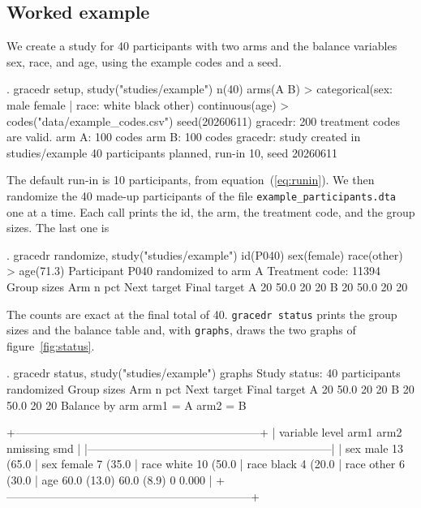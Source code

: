 \documentclass[bib]{statapress}
\begin{document}
\subsection{Worked example}

We create a study for 40 participants with two arms and the balance variables
sex, race, and age, using the example codes and a seed.

\begin{stlog}
. gracedr setup, study("studies/example") n(40) arms(A B)
>     categorical(sex: male female | race: white black other) continuous(age)
>     codes("data/example_codes.csv") seed(20260611)
gracedr: 200 treatment codes are valid.
  arm A: 100 codes
  arm B: 100 codes
gracedr: study created in studies/example
  40 participants planned, run-in 10, seed 20260611
\end{stlog}

\noindent The default run-in is 10 participants, from equation~(\ref{eq:runin}).
We then randomize the 40 made-up participants of the file
\texttt{example\_participants.dta} one at a time. Each call prints the id, the
arm, the treatment code, and the group sizes. The last one is

\begin{stlog}
. gracedr randomize, study("studies/example") id(P040) sex(female) race(other)
>     age(71.3)
Participant P040 randomized to arm A
Treatment code: 11394
Group sizes
Arm                        n     pct   Next target  Final target
A                         20    50.0            20            20
B                         20    50.0            20            20
\end{stlog}

\noindent The counts are exact at the final total of 40.
\texttt{gracedr status} prints the group sizes and the balance table and, with
\texttt{graphs}, draws the two graphs of figure~\ref{fig:status}.

\begin{stlog}
. gracedr status, study("studies/example") graphs
Study status: 40 participants randomized
Group sizes
Arm                        n     pct   Next target  Final target
A                         20    50.0            20            20
B                         20    50.0            20            20
Balance by arm
  arm1 = A
  arm2 = B

  +-----------------------------------------------------------------+
  | variable    level          arm1         arm2   nmissing     smd |
  |-----------------------------------------------------------------|
  |      sex     male    13 (65.0%
  |      sex   female     7 (35.0%
  |     race    white    10 (50.0%
  |     race    black     4 (20.0%
  |     race    other     6 (30.0%
  |      age            60.0 (13.0)   60.0 (8.9)          0   0.000 |
  +-----------------------------------------------------------------+
\end{stlog}
\end{document}
